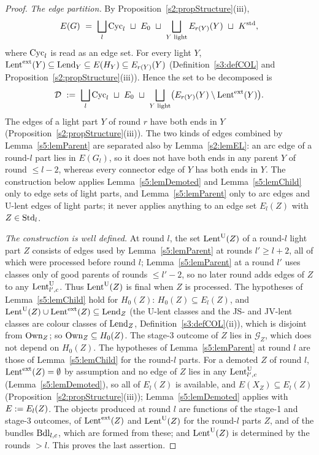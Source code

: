\begin{proof}
\emph{The edge partition.} By Proposition~\ref{s2:propStructure}(iii),
\[
E(G)\ =\ \bigsqcup_l\Cyc_l\ \sqcup\ E_0\ \sqcup\ \bigsqcup_{Y\text{ light}}E_{r(Y)}(Y)\ \sqcup\ \Kstd ,
\]
where $\mathrm{Cyc}_l$ is read as an edge set. For every light $Y$, $\mathrm{Lent}^{\mathrm{ext}}(Y)\subseteq\mathrm{Lend}_Y\subseteq E(H_Y)\subseteq E_{r(Y)}(Y)$ (Definition~\ref{s3:defCOL} and Proposition~\ref{s2:propStructure}(iii)). Hence the set to be decomposed is
\[
\mathcal D\ \defeq\ \bigsqcup_l\Cyc_l\ \sqcup\ E_0\ \sqcup\ \bigsqcup_{Y\text{ light}}\bigl(E_{r(Y)}(Y)\setminus\Lentext(Y)\bigr).
\]
The edges of a light part $Y$ of round $r$ have both ends in $Y$ (Proposition~\ref{s2:propStructure}(iii)). The two kinds of edges combined by Lemma~\ref{s5:lemParent} are separated also by Lemma~\ref{s2:lemEL}: an arc edge of a round-$l$ part lies in $E(G_l)$, so it does not have both ends in any parent $Y$ of round $\le l-2$, whereas every connector edge of $Y$ has both ends in $Y$. The construction below applies Lemma~\ref{s5:lemDemoted} and Lemma~\ref{s5:lemChild} only to edge sets of light parts, and Lemma~\ref{s5:lemParent} only to arc edges and U-lent edges of light parts; it never applies anything to an edge set $E_l(Z)$ with $Z\in\mathrm{Std}_l$.

\emph{The construction is well defined.} At round $l$, the set $\mathrm{Lent}^{\mathrm{U}}(Z)$ of a round-$l$ light part $Z$ consists of edges used by Lemma~\ref{s5:lemParent} at rounds $l'\ge l+2$, all of which were processed before round $l$; Lemma~\ref{s5:lemParent} at a round $l'$ uses classes only of good parents of rounds $\le l'-2$, so no later round adds edges of $Z$ to any $\mathrm{Lent}^{\mathrm{U}}_{l',c}$. Thus $\mathrm{Lent}^{\mathrm{U}}(Z)$ is final when $Z$ is processed. The hypotheses of Lemma~\ref{s5:lemChild} hold for $H_0(Z)$: $H_0(Z)\subseteq E_l(Z)$, and $\mathrm{Lent}^{\mathrm{U}}(Z)\cup\mathrm{Lent}^{\mathrm{ext}}(Z)\subseteq\mathrm{Lend}_Z$ (the U-lent classes and the JS- and JV-lent classes are colour classes of $\mathrm{Lend}_Z$, Definition~\ref{s3:defCOL}(ii)), which is disjoint from $\mathrm{Own}_Z$; so $\mathrm{Own}_Z\subseteq H_0(Z)$. The stage-3 outcome of $Z$ lies in $\mathcal G_Z$, which does not depend on $H_0(Z)$. The hypotheses of Lemma~\ref{s5:lemParent} at round $l$ are those of Lemma~\ref{s5:lemChild} for the round-$l$ parts. For a demoted $Z$ of round $l$, $\mathrm{Lent}^{\mathrm{ext}}(Z)=\emptyset$ by assumption and no edge of $Z$ lies in any $\mathrm{Lent}^{\mathrm{U}}_{l',c}$ (Lemma~\ref{s5:lemDemoted}), so all of $E_l(Z)$ is available, and $E(X_Z)\subseteq E_l(Z)$ (Proposition~\ref{s2:propStructure}(iii)); Lemma~\ref{s5:lemDemoted} applies with $E\mathrel{:=} E_l(Z)$. The objects produced at round $l$ are functions of the stage-1 and stage-3 outcomes, of $\mathrm{Lent}^{\mathrm{ext}}(Z)$ and $\mathrm{Lent}^{\mathrm{U}}(Z)$ for the round-$l$ parts $Z$, and of the bundles $\mathrm{Bdl}_{l,c}$, which are formed from these; and $\mathrm{Lent}^{\mathrm{U}}(Z)$ is determined by the rounds $>l$. This proves the last assertion.


\end{proof}
